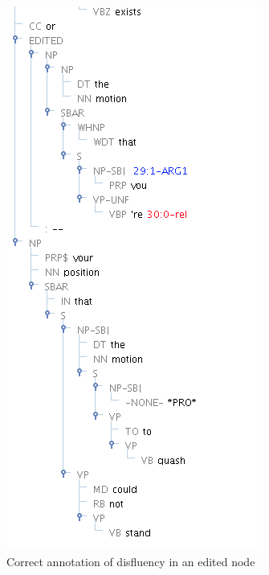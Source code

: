 \documentclass[11pt]{report}
\begin{document}
\begin{figure}[htbp]
\centering
\includegraphics[scale=0.4]{img/Disfluency.png}
\caption{Correct annotation of disfluency in an edited node}
\label{fig: Disfluency}
\end{figure}
\end{document}
